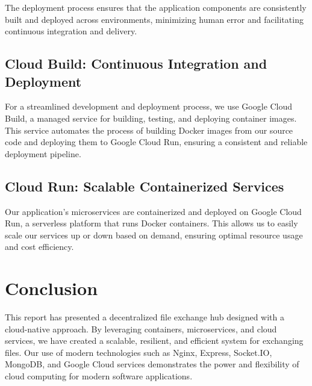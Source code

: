 \documentclass[a4paper,fleqn]{cas-dc}
\begin{document}
The deployment process ensures that the application components are consistently built and deployed across environments, minimizing human error and facilitating continuous integration and delivery.


\subsection{Cloud Build: Continuous Integration and Deployment}

For a streamlined development and deployment process, we use Google Cloud Build, a managed service for building, testing, and deploying container images. This service automates the process of building Docker images from our source code and deploying them to Google Cloud Run, ensuring a consistent and reliable deployment pipeline.

\subsection{Cloud Run: Scalable Containerized Services}

Our application's microservices are containerized and deployed on Google Cloud Run, a serverless platform that runs Docker containers. This allows us to easily scale our services up or down based on demand, ensuring optimal resource usage and cost efficiency.

\section{Conclusion}

This report has presented a decentralized file exchange hub designed with a cloud-native approach. By leveraging containers, microservices, and cloud services, we have created a scalable, resilient, and efficient system for exchanging files. Our use of modern technologies such as Nginx, Express, Socket.IO, MongoDB, and Google Cloud services demonstrates the power and flexibility of cloud computing for modern software applications.

%
%
%


\end{document}
